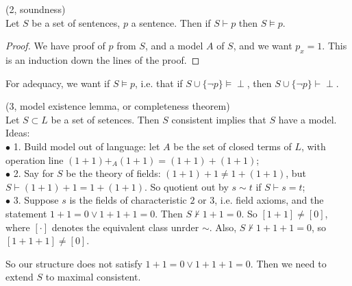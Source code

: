 \documentclass[a4paper]{article}
\begin{document}
\begin{prop} (2, soundness)\\
Let $S$ be a set of sentences, $p$ a sentence. Then if $S \vdash p$ then $S \vDash p$.
\begin{proof}
We have proof of $p$ from $S$, and a model $A$ of $S$, and we want $p_x = 1$. This is an induction down the lines of the proof.
\end{proof}
\end{prop}

For adequacy, we want if $S \vDash p$, i.e. that if $S \cup \{\neg p\} \vDash \perp$, then $S \cup \{\neg p\} \vdash \perp$.

\begin{thm} (3, model existence lemma, or completeness theorem)\\
Let $S \subset L$ be a set of setences. Then $S$ consistent implies that $S$ have a model.\\
Ideas:\\
$\bullet$ 1. Build model out of language: let $A$ be the set of closed terms of $L$, with operation line $(1+1) +_A (1+1) = (1+1) +(1+1)$;\\
$\bullet$ 2. Say for $S$ be the theory of fields: $(1+1)+1 \neq 1+(1+1)$, but $S \vdash (1+1)+1 = 1+(1+1)$. So quotient out by $s \sim t$ if $S \vdash s = t$;\\
$\bullet$ 3. Suppose $s$ is the fields of characteristic $2$ or $3$, i.e. field axioms, and the statement $1+1=0 \vee 1+1+1=0$. Then $S \not\vdash 1+1=0$. So $[1+1] \neq [0]$, where $[\cdot]$ denotes the equivalent class unrder $\sim$. Also, $S \not\vdash 1+1+1=0$, so $[1+1+1] \neq [0]$.

So our structure does not satisfy $1+1=0 \vee 1+1+1 = 0$. Then we need to extend $S$ to maximal consistent.


\end{thm}
\end{document}
